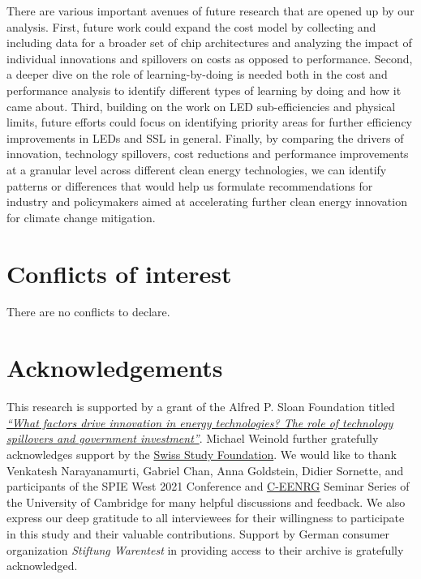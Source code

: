 \documentclass[twoside,twocolumn,9pt]{article}
\renewcommand{\refname}{Notes and references}
\begin{document}
There are various important avenues of future research that are opened up by our analysis. First, future work could expand the cost model by collecting and including data for a broader set of chip architectures and analyzing the impact of individual innovations and spillovers on costs as opposed to performance. Second, a deeper dive on the role of learning-by-doing is needed both in the cost and performance analysis to identify different types of learning by doing and how it came about. Third, building on the work on LED sub-efficiencies and physical limits, future efforts could focus on identifying priority areas for further efficiency improvements in LEDs and SSL in general. Finally, by comparing the drivers of innovation, technology spillovers, cost reductions and performance improvements at a granular level across different clean energy technologies, we can identify patterns or differences that would help us formulate recommendations for industry and policymakers aimed at accelerating further clean energy innovation for climate change mitigation. 

\section*{Conflicts of interest}
There are no conflicts to declare.

\section*{Acknowledgements}
This research is supported by a grant of the Alfred P. Sloan Foundation titled \href{http://web.archive.org/web/20200623065733/https://sloan.org/grant-detail/8567}{\textit{“What factors drive innovation in energy technologies? The role of technology spillovers and government investment”}}. Michael Weinold further gratefully acknowledges support by the \href{https://www.studienstiftung.ch/}{Swiss Study Foundation}. We would like to thank Venkatesh Narayanamurti, Gabriel Chan, Anna Goldstein, Didier Sornette, and participants of the SPIE West 2021 Conference and \href{https://www.ceenrg.landecon.cam.ac.uk/}{C-EENRG} Seminar Series of the University of Cambridge for many helpful discussions and feedback. We also express our deep gratitude to all interviewees for their willingness to participate in this study and their valuable contributions. Support by German consumer organization \textit{Stiftung Warentest} in providing access to their archive is gratefully acknowledged.



\balance



\end{document}
